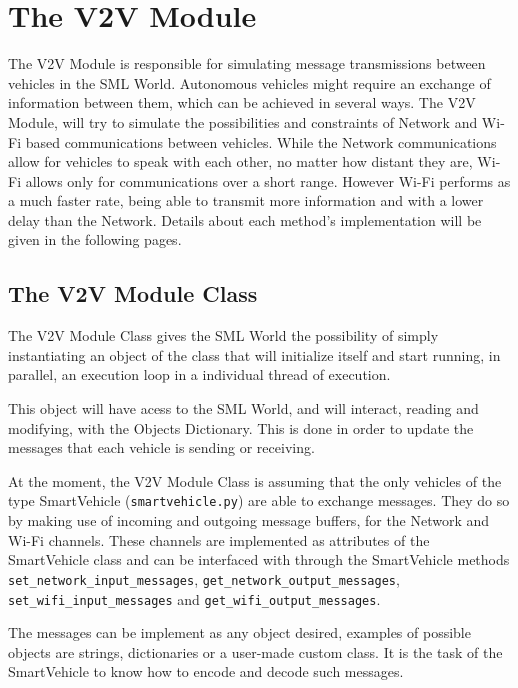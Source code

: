 
\section{The V2V Module}
\label{sec:the_v2v_module}

The V2V Module is responsible for simulating message transmissions between vehicles in the SML World. Autonomous vehicles might require an exchange of information between them, which can be achieved in several ways. The V2V Module, will try to simulate the possibilities and constraints of Network and Wi-Fi based communications between vehicles. While the Network communications allow for vehicles to speak with each other, no matter how distant they are, Wi-Fi allows only for communications over a short range. However Wi-Fi performs as a much faster rate, being able to transmit more information and with a lower delay than the Network. Details about each method's implementation will be given in the following pages.

\subsection{The V2V Module Class}

The V2V Module Class gives the SML World the possibility of simply instantiating an object of the class that will initialize itself and start running, in parallel, an execution loop in a individual thread of execution.

This object will have acess to the SML World, and will interact, reading and modifying, with the Objects Dictionary. This is done in order to update the messages that each vehicle is sending or receiving.

At the moment, the V2V Module Class is assuming that the only vehicles of the type SmartVehicle (\texttt{smartvehicle.py}) are able to exchange messages. They do so by making use of incoming and outgoing message buffers, for the Network and Wi-Fi channels. These channels are implemented as attributes of the SmartVehicle class and can be interfaced with through the SmartVehicle methods \texttt{set\_network\_input\_messages}, \texttt{get\_network\_output\_messages}, \texttt{set\_wifi\_input\_messages} and \texttt{get\_wifi\_output\_messages}.

The messages can be implement as any object desired, examples of possible objects are strings, dictionaries or a user-made custom class. It is the task of the SmartVehicle to know how to encode and decode such messages.

